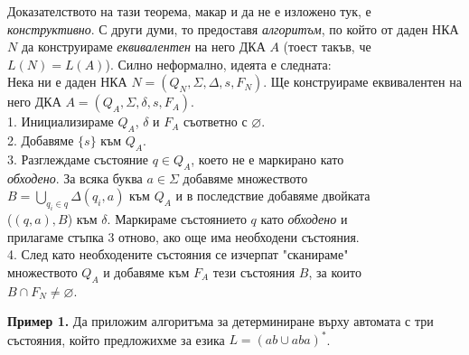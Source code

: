 \documentclass[openany]{book}
\begin{document}
        Доказателството на тази теорема, макар и да не е изложено тук, е \textit{конструктивно}.
        С други думи, то предоставя \textit{алгоритъм}, по който от даден НКА $N$ да 
        конструираме \textit{еквивалентен} на него ДКА $A$ (тоест такъв, че $L(N) = L(A)$).
        Силно неформално, идеята е следната: \\
        \vspace{15pt}
        Нека ни е даден НКА $N = (Q_N,\Sigma,\Delta,s,F_N)$. Ще конструираме еквивалентен
        на него ДКА $A = (Q_A,\Sigma,\delta,s,F_A)$. \\
        \hspace{1cm} 1. Инициализираме $Q_A$, $\delta$ и $F_A$ съответно с $\varnothing$. \\
        \hspace{1cm} 2. Добавяме $\{s\}$ към $Q_A$. \\
        \hspace{1cm} 3. Разглеждаме състояние $q \in Q_A$, което не е маркирано като \\
        \hspace{1cm} \textit{обходено}.  За всяка буква $a \in \Sigma$ добавяме множеството \\
        \hspace{1cm} $B = \bigcup\limits_{q_i \in q}\Delta(q_i,a)$ към $Q_A$ и в последствие добавяме двойката \\
        \hspace{1cm} ($(q,a),B$) към $\delta$. Маркираме състоянието $q$ като \textit{обходено} и \\
        \hspace{1cm} прилагаме стъпка 3 отново, ако още има необходени състояния. \\
        \hspace{1cm} 4. След като необходените състояния се изчерпат "сканираме" \hspace{0.01cm} \\
        \hspace{1cm} множеството $Q_A$ и добавяме към $F_A$ тези състояния $B$, за които \\
        \hspace{1cm} $B \cap F_N \neq \varnothing$.
    
        \vspace{15pt}
    
        \textbf{Пример 1.} Да приложим алгоритъма за детерминиране върху автомата с три 
        състояния, който предложихме за езика $L = ({ab} \cup {aba})^*$.
    
\end{document}
